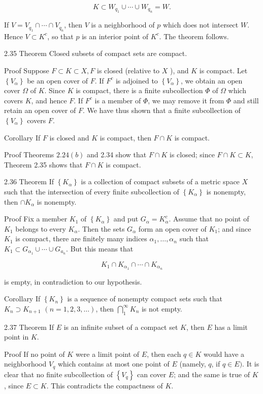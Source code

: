 \documentclass[10pt]{article}
\begin{document}
$$
K \subset W_{q_{1}} \cup \cdots \cup W_{q_{n}}=W .
$$

If $V=V_{q_{1}} \cap \cdots \cap V_{q_{n}}$, then $V$ is a neighborhood of $p$ which does not intersect $W$. Hence $V \subset K^{c}$, so that $p$ is an interior point of $K^{c}$. The theorem follows.

2.35 Theorem Closed subsets of compact sets are compact.

Proof Suppose $F \subset K \subset X, F$ is closed (relative to $X$ ), and $K$ is compact. Let $\left\{V_{\alpha}\right\}$ be an open cover of $F$. If $F^{c}$ is adjoined to $\left\{V_{\alpha}\right\}$, we obtain an open cover $\Omega$ of $K$. Since $K$ is compact, there is a finite subcollection $\Phi$ of $\Omega$ which covers $K$, and hence $F$. If $F^{c}$ is a member of $\Phi$, we may remove it from $\Phi$ and still retain an open cover of $F$. We have thus shown that a finite subcollection of $\left\{V_{\alpha}\right\}$ covers $F$.

Corollary If $F$ is closed and $K$ is compact, then $F \cap K$ is compact.

Proof Theorems $2.24(b)$ and 2.34 show that $F \cap K$ is closed; since $F \cap K \subset K$, Theorem 2.35 shows that $F \cap K$ is compact.

2.36 Theorem If $\left\{K_{\alpha}\right\}$ is a collection of compact subsets of a metric space $X$ such that the intersection of every finite subcollection of $\left\{K_{\alpha}\right\}$ is nonempty, then $\cap K_{\alpha}$ is nonempty.

Proof Fix a member $K_{1}$ of $\left\{K_{\alpha}\right\}$ and put $G_{\alpha}=K_{\alpha}^{c}$. Assume that no point of $K_{1}$ belongs to every $K_{\alpha}$. Then the sets $G_{\alpha}$ form an open cover of $K_{1}$; and since $K_{1}$ is compact, there are finitely many indices $\alpha_{1}, \ldots, \alpha_{n}$ such that $K_{1} \subset G_{\alpha_{1}} \cup \cdots \cup G_{a_{n}}$. But this means that

$$
K_{1} \cap K_{\alpha_{1}} \cap \cdots \cap K_{\alpha_{n}}
$$

is empty, in contradiction to our hypothesis.

Corollary If $\left\{K_{n}\right\}$ is a sequence of nonempty compact sets such that $K_{n} \supset K_{n+1}$ $(n=1,2,3, \ldots)$, then $\bigcap_{1}^{\infty} K_{n}$ is not empty.

2.37 Theorem If $E$ is an infinite subset of a compact set $K$, then $E$ has a limit point in $K$.

Proof If no point of $K$ were a limit point of $E$, then each $q \in K$ would have a neighborhood $V_{q}$ which contains at most one point of $E$ (namely, $q$, if $q \in E)$. It is clear that no finite subcollection of $\left\{V_{q}\right\}$ can cover $E$; and the same is true of $K$, since $E \subset K$. This contradicts the compactness of $K$.
\end{document}
